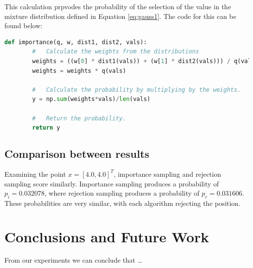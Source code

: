 \documentclass[a4paper, 11pt]{article}
\begin{document}
This calculation prpvodes the probability of the selection of the value in the mixture distribution defined in Equation \ref*{eq:gauss1}. The code for this can be found below:
\begin{lstlisting}[language=Python, caption=Importance Sampling Code.]
    def importance(q, w, dist1, dist2, vals):
        #   Calculate the weights from the distributions
        weights = ((w[0] * dist1(vals)) + (w[1] * dist2(vals))) / q(vals) #np.sum(((w[0] * dist1(samples)) + (w[1] * dist2(samples))))
        weights = weights * q(vals)

        #   Calculate the probability by multiplying by the weights.
        y = np.sum(weights*vals)/len(vals)

        #   Return the probability.
        return y
\end{lstlisting}

\subsection*{Comparison between results}

Examining the point $x = [4.0, 4.0]^T$, importance sampling and rejection sampling score similarly. Importance sampling produces a probability of $p_i = 0.032078$, where rejection sampling produces a probability of $p_r = 0.031606$. These probabilities are very similar, with each algorithm rejecting the position. 
\pagebreak

\section{Conclusions and Future Work}

From our experiments we can conclude that \ldots


\end{document}
